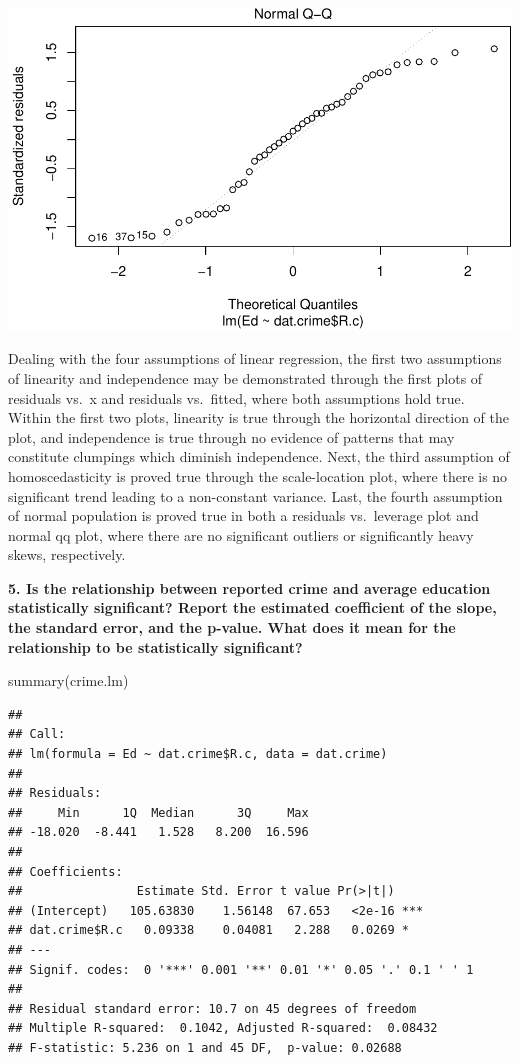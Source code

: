 \documentclass[
]{article}
\newenvironment{Shaded}{\begin{snugshade}}{\end{snugshade}}
\newcommand{\FunctionTok}[1]{\textcolor[rgb]{0.00,0.00,0.00}{#1}}
\newcommand{\NormalTok}[1]{#1}
\begin{document}
\includegraphics{Journal_files/figure-latex/unnamed-chunk-38-5.pdf}

Dealing with the four assumptions of linear regression, the first two
assumptions of linearity and independence may be demonstrated through
the first plots of residuals vs.~x and residuals vs.~fitted, where both
assumptions hold true. Within the first two plots, linearity is true
through the horizontal direction of the plot, and independence is true
through no evidence of patterns that may constitute clumpings which
diminish independence. Next, the third assumption of homoscedasticity is
proved true through the scale-location plot, where there is no
significant trend leading to a non-constant variance. Last, the fourth
assumption of normal population is proved true in both a residuals
vs.~leverage plot and normal qq plot, where there are no significant
outliers or significantly heavy skews, respectively.

\textbf{5. Is the relationship between reported crime and average
education statistically significant? Report the estimated coefficient of
the slope, the standard error, and the p-value. What does it mean for
the relationship to be statistically significant?}

\begin{Shaded}
\begin{Highlighting}[]
\FunctionTok{summary}\NormalTok{(crime.lm) }
\end{Highlighting}
\end{Shaded}

\begin{verbatim}
## 
## Call:
## lm(formula = Ed ~ dat.crime$R.c, data = dat.crime)
## 
## Residuals:
##     Min      1Q  Median      3Q     Max 
## -18.020  -8.441   1.528   8.200  16.596 
## 
## Coefficients:
##                Estimate Std. Error t value Pr(>|t|)    
## (Intercept)   105.63830    1.56148  67.653   <2e-16 ***
## dat.crime$R.c   0.09338    0.04081   2.288   0.0269 *  
## ---
## Signif. codes:  0 '***' 0.001 '**' 0.01 '*' 0.05 '.' 0.1 ' ' 1
## 
## Residual standard error: 10.7 on 45 degrees of freedom
## Multiple R-squared:  0.1042, Adjusted R-squared:  0.08432 
## F-statistic: 5.236 on 1 and 45 DF,  p-value: 0.02688
\end{verbatim}
\end{document}

